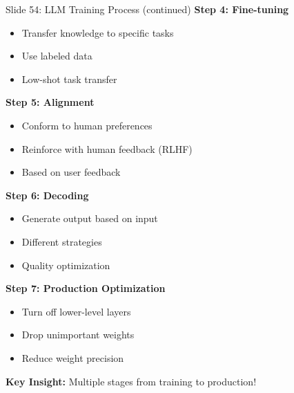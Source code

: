 \documentclass[8pt]{beamer}
\begin{document}
	\begin{frame}{Slide 54: LLM Training Process (continued)}
		\fontsize{6.5}{7.5}\selectfont
		\textbf{Step 4: Fine-tuning}
		\begin{itemize}
			\item Transfer knowledge to specific tasks
			\item Use labeled data
			\item Low-shot task transfer
		\end{itemize}
		
		\vspace{0.1cm}
		\textbf{Step 5: Alignment}
		\begin{itemize}
			\item Conform to human preferences
			\item Reinforce with human feedback (RLHF)
			\item Based on user feedback
		\end{itemize}
		
		\vspace{0.1cm}
		\textbf{Step 6: Decoding}
		\begin{itemize}
			\item Generate output based on input
			\item Different strategies
			\item Quality optimization
		\end{itemize}
		
		\vspace{0.1cm}
		\textbf{Step 7: Production Optimization}
		\begin{itemize}
			\item Turn off lower-level layers
			\item Drop unimportant weights
			\item Reduce weight precision
		\end{itemize}
		
		\textcolor{myblue}{\textbf{Key Insight:}} Multiple stages from training to production!
	\end{frame}
	
\end{document}

